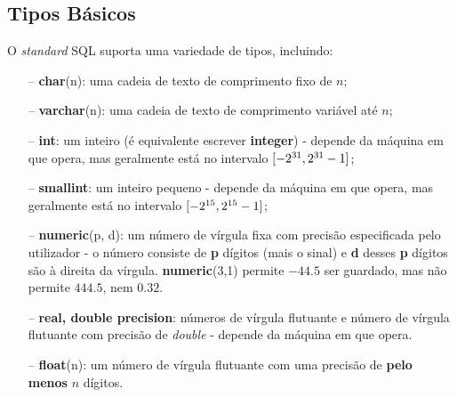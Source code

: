 \documentclass[titlepage]{book}
\theoremstyle{definition}
\begin{document}
\subsection{Tipos Básicos}
O \textit{standard} SQL suporta uma variedade de tipos, incluindo:
\begin{itemize}
    \itemsep0cm
    \item[--]\textbf{char}(n): uma cadeia de texto de comprimento fixo de $n$;
    \item[--]\textbf{varchar}(n): uma cadeia de texto de comprimento variável até $n$;
    \item[--]\textbf{int}: um inteiro (é equivalente escrever \textbf{integer}) - depende da máquina em que opera, mas geralmente está no intervalo $\interval{-2^{31}}{2^{31} - 1}$;
    \item[--]\textbf{smallint}: um inteiro pequeno - depende da máquina em que opera, mas geralmente está no intervalo $\interval{-2^{15}}{2^{15} - 1}$;
    \item[--]\textbf{numeric}(p, d): um número de vírgula fixa com precisão especificada pelo utilizador - o número consiste de \textbf{p} dígitos (mais o sinal) e \textbf{d} desses \textbf{p} dígitos são à direita da vírgula. \textbf{numeric}(3,1) permite $-44.5$ ser guardado, mas não permite $444.5$, nem $0.32$.
    \item[--]\textbf{real, double precision}: números de vírgula flutuante e número de vírgula flutuante com precisão de \textit{double} - depende da máquina em que opera.
    \item[--]\textbf{float}(n): um número de vírgula flutuante com uma precisão de \textbf{pelo menos} $n$ dígitos.
\end{itemize}
\end{document}
